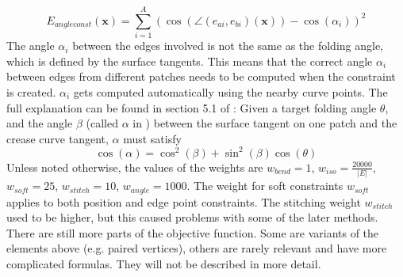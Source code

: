 \documentclass[a4paper,twoside,12pt,nochapterprefix]{scrbook}
\begin{document}
\begin{equation}
E_{angleconst}(\mathbf{x}) = \sum_{i = 1}^A (\cos( \angle(e_{ai}, e_{bi})(\mathbf{x})) - \cos(\alpha_i ))^2
\end{equation}
The angle $\alpha_i$ between the edges involved is not the same as the folding angle, which is defined by the surface tangents. This means that the correct angle $\alpha_i$ between edges from different patches needs to be computed when the constraint is created. $\alpha_i$ gets computed automatically using the nearby curve points. The full explanation can be found in section 5.1 of \cite{Rabinovich:CurvedFolds:2019}: Given a target folding angle $\theta$, and the angle $\beta$ (called $\alpha$ in \cite{Rabinovich:CurvedFolds:2019}) between the surface tangent on one patch and the crease curve tangent, $\alpha$ must satisfy
\begin{equation}
\cos(\alpha)= \cos^2(\beta) + \sin^2(\beta)\cos(\theta)
\end{equation}
Unless noted otherwise, the values of the weights are $w_{bend} = 1$,  $w_{iso} = \frac{20000}{|E|}$, $w_{soft} = 25$, $w_{stitch} = 10$, $w_{angle} = 1000$. The weight for soft constraints $w_{soft}$ applies to both position and edge point constraints. The stitching weight $w_{stitch}$ used to be higher, but this caused problems with some of the later methods.\newline
There are still more parts of the objective function. Some are variants of the elements above (e.g. paired vertices), others are rarely relevant and have more complicated formulas. They will not be described in more detail.\newline
\end{document}
